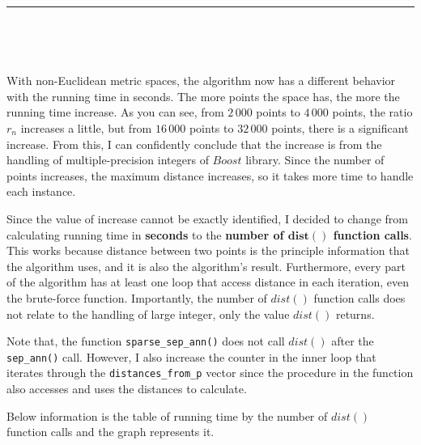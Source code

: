\documentclass[12pt,english,]{article}
\newcommand{\code}[1]{\colorbox{light-gray}{\texttt{#1}}}
\begin{document}
\hrule

~

~

With non-Euclidean metric spaces, the algorithm now has a different
behavior with the running time in seconds. The more points the space
has, the more the running time increase. As you can see, from \(2\,000\)
points to \(4\,000\) points, the ratio \(r_n\) increases a little, but
from \(16\,000\) points to \(32\,000\) points, there is a significant
increase. From this, I can confidently conclude that the increase is
from the handling of multiple-precision integers of \(Boost\) library.
Since the number of points increases, the maximum distance increases, so
it takes more time to handle each instance.

Since the value of increase cannot be exactly identified, I decided to
change from calculating running time in \textbf{seconds} to the
\textbf{number of \(\boldsymbol{dist()}\) function calls}. This works
because distance between two points is the principle information that
the algorithm uses, and it is also the algorithm's result. Furthermore,
every part of the algorithm has at least one loop that access distance
in each iteration, even the brute-force function. Importantly, the
number of \(dist()\) function calls does not relate to the handling of
large integer, only the value \(dist()\) returns.

Note that, the function \code{sparse\_sep\_ann()} does not call
\(dist()\) after the \code{sep\_ann()} call. However, I also increase
the counter in the inner loop that iterates through the
\code{distances\_from\_p} vector since the procedure in the function
also accesses and uses the distances to calculate.

Below information is the table of running time by the number of
\(dist()\) function calls and the graph represents it.
\end{document}
